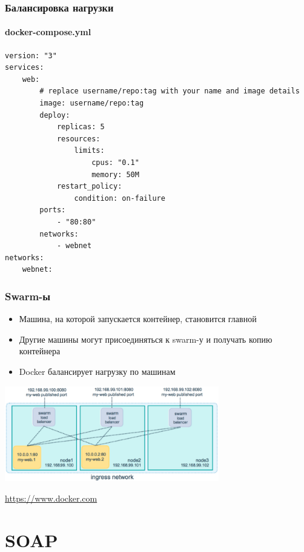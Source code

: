 \documentclass[xetex,mathserif,serif]{beamer}
\newcommand{\attribution}[1] {
	\begin{flushright}\begin{scriptsize}\textcolor{gray}{\textcopyright\; #1}\end{scriptsize}\end{flushright}
}
\begin{document}
	\begin{frame}[fragile]
		\frametitle{Балансировка нагрузки}
		\framesubtitle{docker-compose.yml}
		\begin{scriptsize}
			\begin{verbatim}
version: "3"
services:
    web:
        # replace username/repo:tag with your name and image details
        image: username/repo:tag
        deploy:
            replicas: 5
            resources:
                limits:
                    cpus: "0.1"
                    memory: 50M
            restart_policy:
                condition: on-failure
        ports:
            - "80:80"
        networks:
            - webnet
networks:
    webnet:
			\end{verbatim}
		\end{scriptsize}
	\end{frame}

	\begin{frame}
		\frametitle{Swarm-ы}
		\begin{itemize}
			\item Машина, на которой запускается контейнер, становится главной
			\item Другие машины могут присоединяться к swarm-у и получать копию контейнера
			\item Docker балансирует нагрузку по машинам
		\end{itemize}
		\begin{center}
			\includegraphics[width=0.7\textwidth]{swarmLoadBalancing.png}
			\attribution{\url{https://www.docker.com}}
		\end{center}
	\end{frame}

	\section{SOAP}
\end{document}
